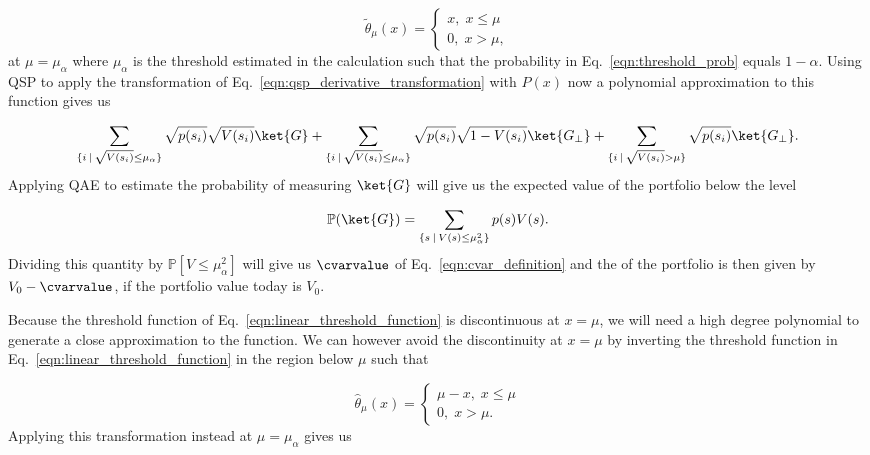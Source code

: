\begin{enumerate}
\begin{equation}
	\label{eqn:linear_threshold_function}
	\tilde{\theta}_{\mu}(x) = \begin{cases}
x, \; {x} \le {\mu} \\
0, \; {x} > {\mu},
\end{cases}
\end{equation}
at $\mu = \mu_{\alpha}$ where $\mu_{\alpha}$ is the threshold estimated in the \var{} calculation such that the probability in Eq.~\eqref{eqn:threshold_prob} equals $1-\alpha$.
Using QSP to apply the transformation of Eq.~\eqref{eqn:qsp_derivative_transformation} with $P(x)$ now a polynomial approximation to this function gives us

\begin{equation}
	\label{eqn:qsp_cvar_final_state}
	\sum_{\{i  \: | \: \sqrt{V(s_i)} \le \mu_{\alpha}\}}\sqrt{p(s_i)}\sqrt{V(s_i)}\ket{G} + \sum_{\{i  \: | \: \sqrt{V(s_i)} \le \mu_{\alpha}\}}\sqrt{p(s_i)}\sqrt{1-V(s_i)}\ket{G_{\perp}} + \sum_{\{i  \: | \: \sqrt{V(s_i)} > \mu\}}\sqrt{p(s_i)}\ket{G_{\perp}}.
\end{equation}
Applying QAE to estimate the probability of measuring $\ket{G}$ will give us the expected value of the portfolio below the \var{} level

\begin{equation}
	\label{eqn:threshold_prob_cvar}
	\mathbb{P}(\ket{G}) = \sum_{ \{s  \: | \: V(s) \le \mu_{\alpha}^2\} } p(s)V(s).
\end{equation}
Dividing this quantity by $\mathbb{P}[V \le \mu_{\alpha}^2]$ will give us $\cvarvalue$ of Eq.~\eqref{eqn:cvar_definition} and the \cvar{} of the portfolio is then given by $V_0-\cvarvalue$, if the portfolio value today is $V_0$.

Because the threshold function of Eq.~\eqref{eqn:linear_threshold_function} is discontinuous at $x=\mu$, we will need a high degree polynomial to generate a close approximation to the function.
We can however avoid the discontinuity at $x=\mu$ by inverting the threshold function in Eq.~\eqref{eqn:linear_threshold_function} in the region below $\mu$ such that

\begin{equation}
	\label{eqn:inverted_linear_threshold_function}
	\hat{\theta}_{\mu}(x) = \begin{cases}
\mu-x, \; {x} \le {\mu} \\
0, \; {x} > {\mu}.
\end{cases}
\end{equation}
Applying this transformation instead at $\mu = \mu_{\alpha}$ gives us


\end{enumerate}
